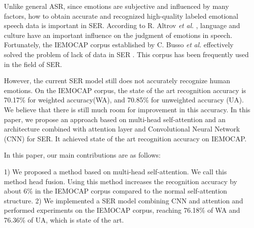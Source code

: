 \documentclass[10pt, conference, compsocconf]{IEEEtran}
\begin{document}
Unlike general ASR, since emotions are subjective and influenced by many factors, how to obtain accurate and recognized high-quality labeled emotional speech data is important in SER. According to R. Altrov \emph{et al.} \cite{altrov2015influence}, language and culture have an important influence on the judgment of emotions in speech. Fortunately, the IEMOCAP corpus established by C. Busso \emph{et al.} effectively solved the problem of lack of data in SER \cite{busso2008iemocap}. This corpus has been frequently used in the field of SER.

However, the current SER model still does not accurately recognize human emotions. On the IEMOCAP corpus, the state of the art recognition accuracy is 70.17\% for weighted accuracy(WA), and 70.85\% for unweighted accuracy (UA)\cite{tarantino2019self}. We believe that there is still much room for improvement in this accuracy.
In this paper, we propose an approach based on multi-head self-attention and an architecture combined with attention layer and Convolutional Neural Network (CNN) for SER. It achieved state of the art recognition accuracy on IEMOCAP.

In this paper, our main contributions are as follows:

1) We proposed a method based on multi-head self-attention. We call this method head fusion. Using this method increases the recognition accuracy by about 6\% in the IEMOCAP corpus compared to the normal self-attention structure.
2) We implemented a SER model combining CNN and attention and performed experiments on the IEMOCAP corpus, reaching 76.18\% of WA and 76.36\% of UA, which is state of the art.


%
%

\end{document}
